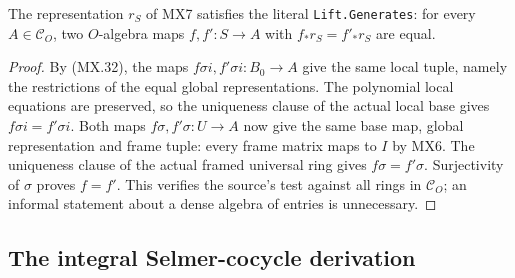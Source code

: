 \begin{proposition}
\label{claim:MX8}
The representation $r_S$ of MX7 satisfies the literal
\texttt{Lift.Generates}: for every $A\in\mathcal C_O$,
two $O$-algebra maps $f,f':S\to A$ with
$f_*r_S=f'_*r_S$ are equal.
\end{proposition}
\begin{proof}
By (MX.32), the maps
$f\sigma i,f'\sigma i:B_0\to A$ give the same local
tuple, namely the restrictions of the equal global
representations.  The polynomial local equations are
preserved, so the uniqueness clause of the actual local
base gives $f\sigma i=f'\sigma i$.
Both maps $f\sigma,f'\sigma:U\to A$ now give the
same base map, global representation and frame tuple:
every frame matrix maps to $I$ by MX6.
The uniqueness clause of the actual framed universal
ring gives $f\sigma=f'\sigma$.  Surjectivity of
$\sigma$ proves $f=f'$.  This verifies the source's
test against all rings in $\mathcal C_O$; an informal
statement about a dense algebra of entries is unnecessary.
\end{proof}

\subsection{The integral Selmer-cocycle derivation}

